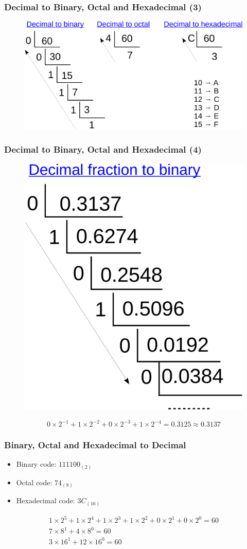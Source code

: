 \begin{frame}
\frametitle{Decimal to Binary, Octal and Hexadecimal (3)}
	\begin{figure}
		\includegraphics[width=0.75\linewidth]{figs/d2b_v2.pdf}
	\end{figure}
\end{frame}

\begin{frame}
\frametitle{Decimal to Binary, Octal and Hexadecimal (4)}
	\begin{figure}
		\includegraphics[width=0.45\linewidth]{figs/d2b1.pdf}
	\end{figure}
\begin{equation}
0{\times}2^{-1}+1{\times}2^{-2}+0{\times}2^{-3}+1{\times}2^{-4}=0.3125 \approx 0.3137 \nonumber
\end{equation}
\end{frame}

\begin{frame}
\frametitle{Binary, Octal and Hexadecimal to Decimal}
	\begin{itemize}
		\item {Binary code: $111100_{(2)}$}
		\item {Octal code: $74_{(8)}$}
		\item {Hexadecimal code: $3C_{(16)}$}
	\end{itemize}
	\begin{eqnarray}
		1\times2^5+1\times2^4+1\times2^3+1\times2^2+0\times2^1+0\times2^0=60 \nonumber \\
		7\times8^1+4\times8^0=60 \nonumber \\
		3\times16^1+12\times16^0=60 \nonumber
	\end{eqnarray}
\end{frame}


